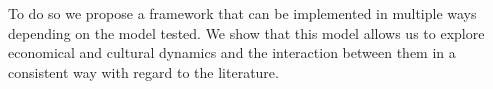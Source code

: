 \documentclass[a0paper,landscape,showframe]{baposter}
\begin{document}
\begin{poster}
{%
% 
%
%
%
To do so we propose a framework that can be implemented in multiple ways depending on the model tested. We show that this model allows us to explore economical and cultural dynamics and the interaction between them in a consistent way with regard to the literature.

}
\end{poster}
\end{document}
